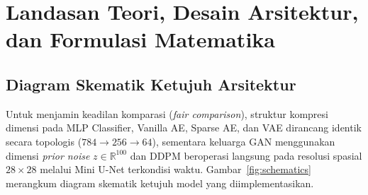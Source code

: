 \documentclass[11pt,a4paper]{article}
\begin{document}
\section{Landasan Teori, Desain Arsitektur, dan Formulasi Matematika}

\subsection{Diagram Skematik Ketujuh Arsitektur}
Untuk menjamin keadilan komparasi (\textit{fair comparison}), struktur kompresi dimensi pada MLP Classifier, Vanilla AE, Sparse AE, dan VAE dirancang identik secara topologis ($784 \rightarrow 256 \rightarrow 64$), sementara keluarga GAN menggunakan dimensi \textit{prior noise} $z \in \mathbb{R}^{100}$ dan DDPM beroperasi langsung pada resolusi spasial $28 \times 28$ melalui Mini U-Net terkondisi waktu. Gambar~\ref{fig:schematics} merangkum diagram skematik ketujuh model yang diimplementasikan.
\end{document}
